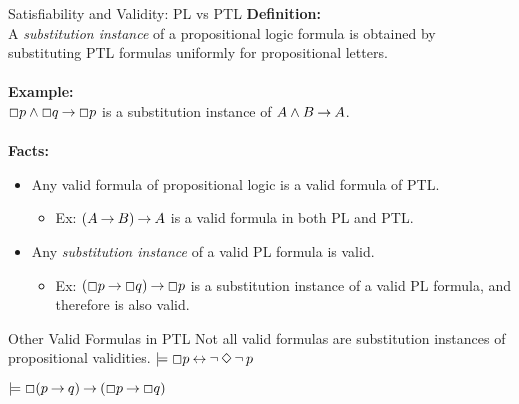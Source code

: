 \documentclass[style=sailor,size=12pt,mode=present]{powerdot}
\theoremstyle{definition}
\newenvironment{thm}[1]
  {\renewcommand\theinnerthm{#1}\innerthm}
  {\endinnerthm}
\begin{document}
\begin{wideslide}[bm=,toc=]{Satisfiability and Validity: PL vs PTL}
{\bf Definition:} \\
A \emph{substitution instance} of a propositional logic formula is
obtained by substituting PTL formulas uniformly for propositional letters.\\~\\
{\bf Example:}\\
$\Box p \land \Box q \mathbin{\rightarrow} \Box p$ is a substitution instance of $A \land B \mathbin{\rightarrow}
A$.\\~\\
{\bf Facts:}\\
\begin{itemize}
\item Any valid formula of propositional logic is a valid formula of PTL.
\begin{itemize}
\item Ex: $(A \mathbin{\rightarrow} B) \mathbin{\rightarrow} A$ is a valid formula in both PL and PTL.
\end{itemize}
\item Any \emph{substitution instance} of a valid PL formula is valid.
\begin{itemize}
\item Ex: $(\Box p \mathbin{\rightarrow} \Box q) \mathbin{\rightarrow} \Box p$ is a substitution instance of a
valid PL formula, and therefore is also valid.
\end{itemize}
\end{itemize}
\end{wideslide}

\begin{wideslide}[bm=,toc=]{Other Valid Formulas in PTL}
Not all valid formulas are substitution instances of propositional validities.
\begin{thm}{13.14}[Duality]
$\models \Box p \mathbin{\leftrightarrow} \mathop{\neg} \Diamond \mathop{\neg} p$
\end{thm}

\begin{thm}{13.15}
$\models \Box (p \mathbin{\rightarrow} q) \mathbin{\rightarrow} (\Box p \mathbin{\rightarrow} \Box q)$
\end{thm}



\end{wideslide}
\end{document}
